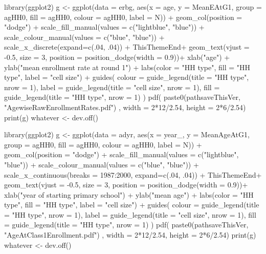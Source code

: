\begin{Schunk}
\begin{Sinput}
library(ggplot2)
g <- ggplot(data = erbg, 
    aes(x = age, y = MeanEAtG1, group = agHH0, fill = agHH0, colour = agHH0, label = N)) + 
  geom_col(position = "dodge") +
  scale_fill_manual(values = c("lightblue", "blue")) +
  scale_colour_manual(values = c("blue", "blue")) +
  scale_x_discrete(expand=c(.04, .04)) +
  ThisThemeEnd+
  geom_text(vjust = -0.5, size = 3, position = position_dodge(width = 0.9))+
  xlab("age") + 
  ylab("mean enrollment rate at round 1") + 
  labs(color  = "HH type", fill = "HH type", label = "cell size") +
  guides(
    colour = guide_legend(title = "HH type", nrow = 1),
    label = guide_legend(title = "cell size", nrow = 1),
    fill = guide_legend(title = "HH type", nrow = 1)
    )
pdf(
  paste0(pathsaveThisVer, "AgewiseRawEnrollmentRates.pdf")
  , width = 2*12/2.54, height = 2*6/2.54)
print(g)
whatever <- dev.off()
\end{Sinput}
\end{Schunk}
\begin{Schunk}
\begin{Sinput}
library(ggplot2)
g <- ggplot(data = adyr, 
    aes(x = year_, y = MeanAgeAtG1, group = agHH0, fill = agHH0, colour = agHH0, label = N)) + 
  geom_col(position = "dodge") +
  scale_fill_manual(values = c("lightblue", "blue")) +
  scale_colour_manual(values = c("blue", "blue")) +
  scale_x_continuous(breaks = 1987:2000, expand=c(.04, .04)) +
  ThisThemeEnd+
  geom_text(vjust = -0.5, size = 3, position = position_dodge(width = 0.9))+
  xlab("year of starting primary school") + 
  ylab("mean age") + 
  labs(color  = "HH type", fill = "HH type", label = "cell size") +
  guides(
    colour = guide_legend(title = "HH type", nrow = 1),
    label = guide_legend(title = "cell size", nrow = 1),
    fill = guide_legend(title = "HH type", nrow = 1)
    )
pdf(
  paste0(pathsaveThisVer, "AgeAtClass1Enrollment.pdf")
  , width = 2*12/2.54, height = 2*6/2.54)
print(g)
whatever <- dev.off()
\end{Sinput}
\end{Schunk}

